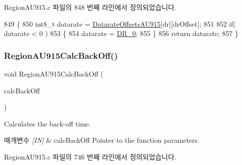 Region\+A\+U915.\+c 파일의 848 번째 라인에서 정의되었습니다.


\begin{DoxyCode}
849 \{
850     int8\_t datarate = \mbox{\hyperlink{group___r_e_g_i_o_n_a_u915_ga21954b1aad2914192201787f60b2203b}{DatarateOffsetsAU915}}[dr][drOffset];
851 
852     \textcolor{keywordflow}{if}( datarate < 0 )
853     \{
854         datarate = \mbox{\hyperlink{group___r_e_g_i_o_n_ga6c4ef966b4f3d5eb7597b087f2b97095}{DR\_0}};
855     \}
856     \textcolor{keywordflow}{return} datarate;
857 \}
\end{DoxyCode}
\mbox{\label{group___r_e_g_i_o_n_a_u915_gaa3847b5ebad54c613afd3b823f1c39e9}} 
\subsubsection{\texorpdfstring{Region\+A\+U915\+Calc\+Back\+Off()}{RegionAU915CalcBackOff()}}
{\footnotesize\ttfamily void Region\+A\+U915\+Calc\+Back\+Off (\begin{DoxyParamCaption}\item[{\mbox{\hyperlink{group___r_e_g_i_o_n_ga7c5c9a8da174e6679eded8257dc92fd9}{Calc\+Back\+Off\+Params\+\_\+t}} $\ast$}]{calc\+Back\+Off }\end{DoxyParamCaption})}



Calculates the back-\/off time. 


\begin{DoxyParams}{매개변수}
{\em \mbox{[}\+I\+N\mbox{]}} & calc\+Back\+Off Pointer to the function parameters. \\
\hline
\end{DoxyParams}


Region\+A\+U915.\+c 파일의 746 번째 라인에서 정의되었습니다.


